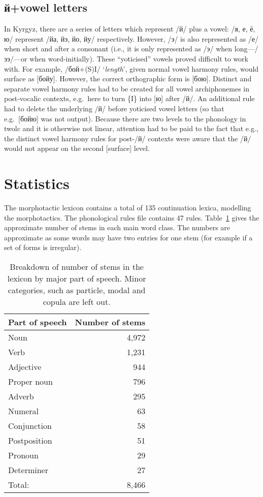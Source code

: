 \documentclass[10pt,a4paper,twocolumn]{article}
\newcommand{\eng}[1]{`{\em #1}'}
\begin{document}
\subsection{й+vowel letters}
\label{sec:yot}
In Kyrgyz, there are a series of letters which represent /й/ plus a vowel: /я, е, ё, ю/ represent /йа, йэ, йо, йу/ respectively.  However, /э/ is also represented as /е/ when short and after a consonant (i.e., it is only represented as /э/ when long—/ээ/—or when word-initially).  These ``yoticised'' vowels proved difficult to work with.  For example, /бой+(S)I/ \eng{length}, given normal vowel harmony rules, would surface as [бойу].  However, the correct orthographic form is [бою].  Distinct and separate vowel harmony rules had to be created for all vowel archiphonemes in post-vocalic contexts, e.g.\ here to turn \{I\} into [ю] after /й/.  An additional rule had to delete the underlying /й/ before yoticised vowel letters (so that e.g.\ [бойю] was not output).  Because there are two levels to the phonology in twolc and it is otherwise not linear, attention had to be paid to the fact that e.g., the distinct vowel harmony rules for post-/й/ contexts were aware that the /й/ would not appear on the second [surface] level.

\section{Statistics}

The morphotactic lexicon contains a total of 135 continuation lexica, modelling the 
morphotactics. The phonological rules file contains 47 rules.  Table~\ref{table:stems} gives the approximate number of stems in each main word class. The numbers
are approximate as some words may have two entries for one stem (for example if a set of forms
is irregular).

\begin{table}
	\centering
	\begin{tabular}{lr}
		\toprule
		Part of speech & Number of stems\\
		\midrule
		Noun & 4,972\\
		Verb & 1,231 \\
		Adjective & 944\\
		Proper noun & 796\\
		Adverb & 295 \\
		Numeral & 63 \\
		Conjunction & 58 \\
		Postposition & 51 \\
		Pronoun & 29\\
		Determiner & 27\\
		\midrule
		Total: & 8,466 \\
		\bottomrule
	\end{tabular}
	\caption{Breakdown of number of stems in the lexicon by major part of speech. Minor categories, such as particle, modal and copula are left out.}\label{table:stems}
\end{table}
\end{document}

